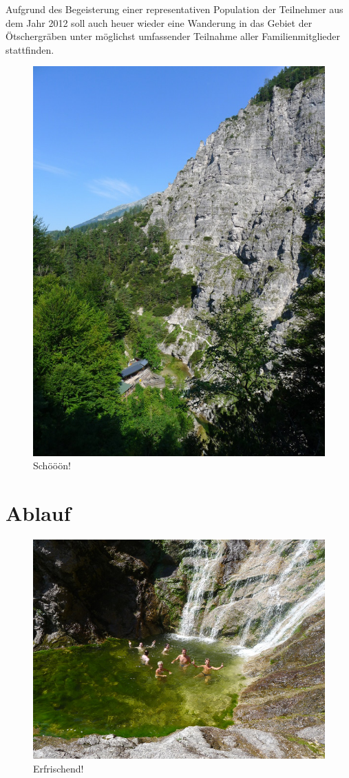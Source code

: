 \documentclass[twoside]{article}
\begin{document}
\begin{multicols}{2}
Aufgrund des Begeisterung einer representativen Population der Teilnehmer aus dem Jahr 2012 soll auch heuer wieder eine Wanderung in das Gebiet der
Ötschergräben unter möglichst umfassender Teilnahme aller Familienmitglieder stattfinden.
\begin{figure}[H]
\begin{center}
  \includegraphics[trim = 0 15 0 0, clip, natwidth=600, natheight=800, width=.45\textwidth]{Figures/oetschergraeben.jpg}
\end{center}
\caption{Schööön!}
\label{fig:oetschergraeben}
\end{figure}


\section{Ablauf}

\begin{figure}
\begin{center}
  \includegraphics[trim = 0 80 0 80, clip, natwidth=800, natheight=600, width=\textwidth]{Figures/bad.jpg}
\end{center}
\caption{Erfrischend!}
\label{fig:bad}
\end{figure}


\end{multicols}
\end{document}
